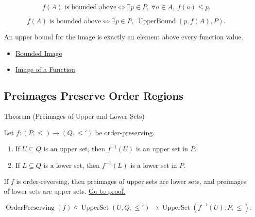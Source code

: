 \begin{remark*}
\[
  f(A)\text{ is bounded above}
  \iff
  \exists p\in P,\ \forall a\in A,\ f(a)\leq p.
\]
\end{remark*}

\begin{remark*}
\[
  f(A)\text{ is bounded above}
  \iff
  \exists p\in P,\ \operatorname{UpperBound}(p,f(A),P).
\]
\end{remark*}

\begin{remark*}[Interpretation]
An upper bound for the image is exactly an element above every function value.
\end{remark*}

\begin{dependencies}
\begin{itemize}
  \item \hyperref[def:bounded-image]{Bounded Image}
  \item \hyperref[def:image-function]{Image of a Function}
\end{itemize}
\end{dependencies}

\subsection*{Preimages Preserve Order Regions}

\begin{theorembox}{Theorem (Preimages of Upper and Lower Sets)}
\begin{theorem}\label{thm:preimage-upper-lower-sets}
Let $f:(P,\leq)\to(Q,\leq')$ be order-preserving.
\begin{enumerate}[label=(\roman*)]
\item If $U\subseteq Q$ is an upper set, then $f^{-1}(U)$ is an upper set in $P$.
\item If $L\subseteq Q$ is a lower set, then $f^{-1}(L)$ is a lower set in $P$.
\end{enumerate}
If $f$ is order-reversing, then preimages of upper sets are lower sets, and
preimages of lower sets are upper sets.
\hyperref[prf:preimage-upper-lower-sets]{Go to proof.}
\end{theorem}
\end{theorembox}

\begin{remark*}
\[
  \operatorname{OrderPreserving}(f)
  \wedge \operatorname{UpperSet}(U,Q,\leq')
  \to
  \operatorname{UpperSet}(f^{-1}(U),P,\leq).
\]
\end{remark*}

